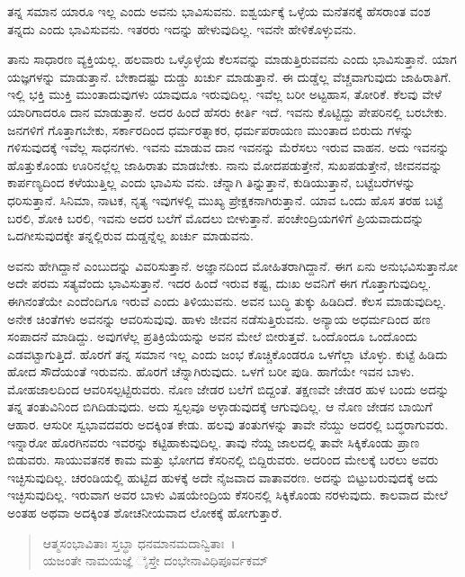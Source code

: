 ತನ್ನ ಸಮಾನ ಯಾರೂ ಇಲ್ಲ ಎಂದು ಅವನು ಭಾವಿಸುವನು. ಐಶ್ವರ್ಯಕ್ಕೆ ಒಳ್ಳೆಯ ಮನೆತನಕ್ಕೆ ಹೆಸರಾಂತ ವಂಶ ತನ್ನದು ಎಂದು ಭಾವಿಸುವನು. ಇತರರು ಇದನ್ನು ಹೇಳುವುದಿಲ್ಲ. ಇವನೇ ಹೇಳಿಕೊಳ್ಳುವನು.

ತಾನು ಸಾಧಾರಣ ವ್ಯಕ್ತಿಯಲ್ಲ. ಹಲವಾರು ಒಳ್ಳೊಳ್ಳೆಯ ಕೆಲಸವನ್ನು ಮಾಡುತ್ತಿರುವವನು ಎಂದು ಭಾವಿಸುತ್ತಾನೆ. ಯಾಗ ಯಜ್ಞಗಳನ್ನು ಮಾಡುತ್ತಾನೆ. ಬೇಕಾದಷ್ಟು ದುಡ್ಡು ಖರ್ಚು ಮಾಡುತ್ತಾನೆ. ಈ ದುಡ್ಡೆಲ್ಲ ವೆಚ್ಚವಾಗುವುದು ಜಾಹಿರಾತಿಗೆ. ಇಲ್ಲಿ ಭಕ್ತಿ ಮುಕ್ತಿ ಮುಂತಾದುವುಗಳು ಯಾವುದೂ ಇರುವುದಿಲ್ಲ. ಇವೆಲ್ಲ ಬರೀ ಅಟ್ಟಹಾಸ, ತೋರಿಕೆ. ಕೆಲವು ವೇಳೆ ಯಾರಿಗಾದರೂ ದಾನ ಮಾಡುತ್ತಾನೆ. ಅದರ ಹಿಂದೆ ಹೆಸರು ಕೀರ್ತಿ ಇದೆ. ಇವನು ಕೊಟ್ಟಿದ್ದು ಪೇಪರಿನಲ್ಲಿ ಬರಬೇಕು. ಜನಗಳಿಗೆ ಗೊತ್ತಾಗಬೇಕು, ಸರ್ಕಾರದಿಂದ ಧರ್ಮರತ್ನಾಕರ, ಧರ್ಮಪರಾಯಣ ಮುಂತಾದ ಬಿರುದು ಗಳನ್ನು ಗಳಿಸುವುದಕ್ಕೆ ಇವೆಲ್ಲ ಸಾಧನಗಳು. ಇವನು ಮಾಡುವ ದಾನ ಇವನನ್ನು ಮೆರೆಸಲು ಇರುವ ವಾಹನ. ಅದು ಇವನನ್ನು ಹೊತ್ತುಕೊಂಡು ಊರಿನಲ್ಲೆಲ್ಲ ಜಾಹಿರಾತು ಮಾಡಬೇಕು. ನಾನು ಮೋದಪಡುತ್ತೇನೆ, ಸುಖಪಡುತ್ತೇನೆ, ಜೀವನವನ್ನು ಕಾರ್ಪಣ್ಯದಿಂದ ಕಳೆಯುತ್ತಿಲ್ಲ ಎಂದು ಭಾವಿಸು ವನು. ಚೆನ್ನಾಗಿ ತಿನ್ನುತ್ತಾನೆ, ಕುಡಿಯುತ್ತಾನೆ, ಬಟ್ಟೆಬರೆಗಳನ್ನು ಧರಿಸುತ್ತಾನೆ. ಸಿನಿಮಾ, ನಾಟಕ, ನೃತ್ಯ ಇವುಗಳಲ್ಲಿ ಮುಖ್ಯ ಪ್ರೇಕ್ಷಕನಾಗಿರುತ್ತಾನೆ. ಯಾವ ಒಂದು ಹೊಸ ತರಹ ಬಟ್ಟೆ ಬರಲಿ, ಶೋಕಿ ಬರಲಿ, ಇವನು ಅದರ ಬಲೆಗೆ ಮೊದಲು ಬೀಳುತ್ತಾನೆ. ಪಂಚೇಂದ್ರಿಯಗಳಿಗೆ ಪ್ರಿಯವಾದುದನ್ನು ಒದಗೀಸುವುದಕ್ಕೇ ತನ್ನಲ್ಲಿರುವ ದುಡ್ಡನ್ನೆಲ್ಲ ಖರ್ಚು ಮಾಡುವನು.

ಅವನು ಹೇಗಿದ್ದಾನೆ ಎಂಬುದನ್ನು ವಿವರಿಸುತ್ತಾನೆ. ಅಜ್ಞಾನದಿಂದ ಮೋಹಿತರಾಗಿದ್ದಾನೆ. ಈಗ ಏನು ಅನುಭವಿಸುತ್ತಾನೋ ಅದೇ ಪರಮ ಸತ್ಯವೆಂದು ಭಾವಿಸುತ್ತಾನೆ. ಇದರ ಹಿಂದೆ ಇರುವ ಕಷ್ಟ, ದುಃಖ ಅವನಿಗೆ ಈಗ ಗೊತ್ತಾಗುವುದಿಲ್ಲ. ಈಗಿನಂತೆಯೇ ಎಂದೆಂದಿಗೂ ಇರುವೆ ಎಂದು ತಿಳಿಯುವನು. ಅವನ ಬುದ್ಧಿ ತುಕ್ಕು ಹಿಡಿದಿದೆ. ಕೆಲಸ ಮಾಡುವುದಿಲ್ಲ. ಅನೇಕ ಚಿಂತೆಗಳು ಅವನನ್ನು ಆವರಿಸುವುವು. ಹಾಳು ಜೀವನ ನಡೆಸುತ್ತಿರುವನು. ಅನ್ಯಾಯ ಅಧರ್ಮದಿಂದ ಹಣ ಸಂಪಾದನೆ ಮಾಡಿದ್ದು. ಅವುಗಳೆಲ್ಲ ಪ್ರತಿಕ್ರಿಯೆಯನ್ನು ಅವನ ಮೇಲೆ ಬೀರುತ್ತವೆ. ಒಂದೊಂದೂ ಒಂದೊಂದು ಎಡವಟ್ಟಾಗುತ್ತಿದೆ. ಹೊರಗೆ ತನ್ನ ಸಮಾನ ಇಲ್ಲ ಎಂದು ಜಂಭ ಕೊಚ್ಚಿಕೊಂಡರೂ ಒಳಗೆಲ್ಲಾ ಟೊಳ್ಳು. ಕುಟ್ಟೆ ಹಿಡಿದು ಹೋದ ಸೌದೆಯಂತೆ ಇರುವನು. ಹೊರಗೆ ಚೆನ್ನಾಗಿರುವುದು. ಒಳಗೆ ಬರೀ ಪುಡಿ. ಹಾಗೆಯೇ ಇವನ ಬಾಳು. ಮೋಹಜಾಲದಿಂದ ಆವರಿಸಲ್ಪಟ್ಟಿರುವರು. ನೊಣ ಜೇಡರ ಬಲೆಗೆ ಬಿದ್ದಂತೆ. ತಕ್ಷಣವೇ ಜೇಡರ ಹುಳ ಬಂದು ಅದನ್ನು ತನ್ನ ತಂತುವಿನಿಂದ ಬಿಗಿದಿಡುವುದು. ಅದು ಸ್ವಲ್ಪವೂ ಅಳ್ಳಾಡುವುದಕ್ಕೆ ಆಗುವುದಿಲ್ಲ. ಆ ನೊಣ ಜೇಡನ ಬಾಯಿಗೆ ಆಹಾರ. ಆಸುರೀ ಸ್ವಭಾವದವರು ಅದಕ್ಕಿಂತ ಕೇಡು. ಹಲವು ತಂತುಗಳನ್ನು ತಾವೇ ನೆಯ್ದು ಅದರಲ್ಲಿ ಬದ್ಧರಾಗುವರು. ಇನ್ನಾರೋ ಹೊರಗಿನವರು ಇವರನ್ನು ಕಟ್ಟಿಹಾಕುವುದಿಲ್ಲ. ತಾವು ನೆಯ್ದ ಜಾಲದಲ್ಲಿ ತಾವೇ ಸಿಕ್ಕಿಕೊಂಡು ಪ್ರಾಣ ಬಿಡುವರು. ಸಾಯುವತನಕ ಕಾಮ ಮತ್ತು ಭೋಗದ ಕೆಸರಿನಲ್ಲಿ ಬಿದ್ದಿರುವರು. ಅದರಿಂದ ಮೇಲಕ್ಕೆ ಬರಲು ಅವರು ಇಚ್ಛಿಸುವುದಿಲ್ಲ. ಚರಂಡಿಯಲ್ಲಿ ಹುಟ್ಟಿದ ಹುಳಕ್ಕೆ ಅದೇ ನೈಜವಾದ ವಾತಾವರಣ. ಅದನ್ನು ಬಿಟ್ಟುಬರುವುದಕ್ಕೆ ಅದು ಇಚ್ಛಿಸುವುದಿಲ್ಲ. ಇರುವಾಗ ಅವರ ಬಾಳು ವಿಷಯೇಂದ್ರಿಯ ಕೆಸರಿನಲ್ಲಿ ಸಿಕ್ಕಿಕೊಂಡು ನರಳುವುದು. ಕಾಲವಾದ ಮೇಲೆ ಅಂತಹ ಅಥವಾ ಅದಕ್ಕಿಂತ ಶೋಚನೀಯವಾದ ಲೋಕಕ್ಕೆ ಹೋಗುತ್ತಾರೆ.

\begin{verse}
ಆತ್ಮಸಂಭಾವಿತಾಃ ಸ್ತಬ್ಧಾ ಧನಮಾನಮದಾನ್ವಿತಾಃ~।\\ಯಜಂತೇ ನಾಮಯಜ್ಞೆ ೈಸ್ತೇ ದಂಭೇನಾವಿಧಿಪೂರ್ವಕಮ್ 
\end{verse}

